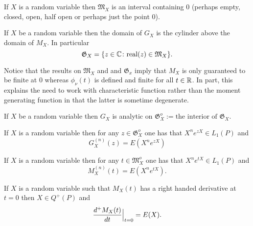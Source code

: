 \begin{theorem}
If $X$ is a random variable then $\mathfrak M_{X}$ is an interval containing $0$ (perhaps empty, closed,  open, half open or perhaps just the point $0$).
\end{theorem}



\begin{theorem}
If $X$ be a random variable then the domain of $G_X$ is the cylinder above the domain of $M_X$. In particular
\[
\mathfrak G_{X} = \{z\in \Bbb C\colon \text{real}(z)\in \mathfrak M_{X}  \}.
\]
\end{theorem}


Notice that the results on $\mathfrak M_X$ and and $\mathfrak G_x$  imply that $M_X$ is only guaranteed to be finite at $0$ whereas $\phi_\nu(t)$ is defined and finite for all $t\in \Bbb R$. In part, this explains the need to work with characteristic function rather than the moment generating function in that the latter is sometime degenerate.


\begin{theorem}
If $X$ be a random variable then $G_X$ is analytic on $\mathfrak G_{X}^o:= \text{the interior of $\mathfrak G_{X}$}$.
\end{theorem}









\begin{theorem}
If $X$ is a random variable then for any $z\in \mathfrak G^o_X$ one has that $ X^n e^{zX} \in L_1(P)$ and
\[
G_X^{(n)}(z) = E(X^n e^{zX})
\]
\end{theorem}


\begin{theorem}
If $X$ is a random variable then for any $t\in \mathfrak M_{X}^o$ one has that $ X^n e^{tX} \in L_1(P)$ and
\[ M^{(n)}_{X}(t)= E(X^n e^{tX}).\]
\end{theorem}




\begin{theorem}
If $X$ is a random variable such that $M_X(t)$ has a right handed derivative at $t=0$ then $X\in Q^+(P)$ and
\[ \Bigl.\frac{d^+M_X(t)}{dt}\Bigr|_{t=0}= E(X).\]
\end{theorem}





